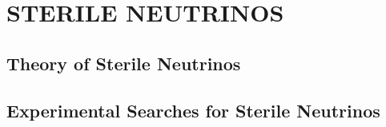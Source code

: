 \chapter{\uppercase{Sterile Neutrinos}}

\section{Theory of Sterile Neutrinos}

\section{Experimental Searches for Sterile Neutrinos}

